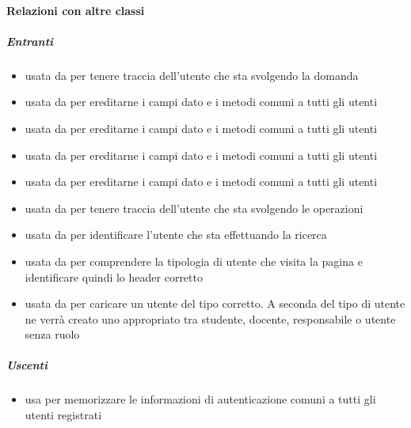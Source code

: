 \paragraph{Relazioni con altre classi}
\subparagraph{Entranti}
\begin{itemize}
\item usata da  per tenere traccia dell'utente che sta svolgendo la domanda
\item usata da  per ereditarne i campi dato e i metodi comuni a tutti gli utenti
\item usata da  per ereditarne i campi dato e i metodi comuni a tutti gli utenti
\item usata da  per ereditarne i campi dato e i metodi comuni a tutti gli utenti
\item usata da  per ereditarne i campi dato e i metodi comuni a tutti gli utenti
\item usata da  per tenere traccia dell'utente che sta svolgendo le operazioni
\item usata da  per identificare l'utente che sta effettuando la ricerca
\item usata da  per comprendere la tipologia di utente che visita la pagina e identificare quindi lo header corretto
\item usata da  per caricare un utente del tipo corretto. A seconda del tipo di utente ne verrà creato uno appropriato tra studente, docente, responsabile o utente senza ruolo
\end{itemize}
\subparagraph{Uscenti}
\begin{itemize}
\item usa  per memorizzare le informazioni di autenticazione comuni a tutti gli utenti registrati
\end{itemize}
